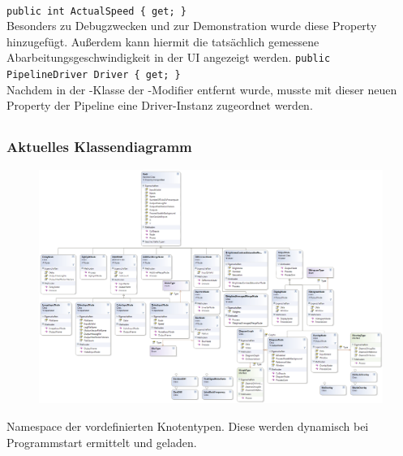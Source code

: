 \paragraph{}
\begin{itemize}
	\add \verb!public int ActualSpeed { get; }! \\
	Besonders zu Debugzwecken und zur Demonstration wurde diese Property hinzugefügt. Außerdem kann hiermit die tatsächlich gemessene Abarbeitungsgeschwindigkeit in der UI angezeigt werden.
	\add \verb!public PipelineDriver Driver { get; }! \\
	Nachdem in der -Klasse der -Modifier entfernt wurde, musste mit dieser neuen Property der Pipeline eine Driver-Instanz zugeordnet werden.
\end{itemize}
\newpage

\subsection{}

\subsubsection*{Aktuelles Klassendiagramm}
\begin{figure}[h!]
\begin{center}
\includegraphics[width=0.8\textheight,angle=90]{classdiagram/pipe-imp.png}
\end{center}
\end{figure}
Namespace der vordefinierten Knotentypen. Diese werden dynamisch bei Programmstart ermittelt und geladen.
\newpage

